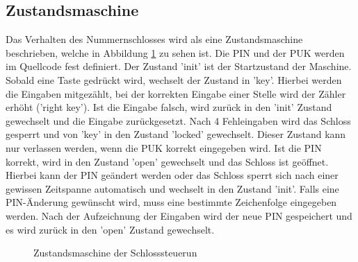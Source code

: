 \subsection{Zustandsmaschine}

Das Verhalten des Nummernschlosses wird als eine Zustandsmaschine beschrieben, welche in Abbildung \ref{fig:M1} zu sehen ist. Die PIN und der PUK werden im Quellcode fest definiert. Der Zustand 'init' ist der Startzustand der Maschine. Sobald eine Taste gedrückt wird, wechselt der Zustand in 'key'. Hierbei werden die Eingaben mitgezählt, bei der korrekten Eingabe einer Stelle wird der Zähler erhöht ('right key'). Ist die Eingabe falsch, wird zurück in den 'init' Zustand gewechselt und die Eingabe zurückgesetzt. Nach 4 Fehleingaben wird das Schloss gesperrt und von 'key' in den Zustand 'locked' gewechselt. Dieser Zustand kann nur verlassen werden, wenn die PUK korrekt eingegeben wird. Ist die PIN korrekt, wird in den Zustand 'open' gewechselt und das Schloss ist geöffnet. Hierbei kann der PIN geändert werden oder das Schloss sperrt sich nach einer gewissen Zeitspanne automatisch und wechselt in den Zustand 'init'. Falls eine PIN-Änderung gewünscht wird, muss eine bestimmte Zeichenfolge eingegeben werden. Nach der Aufzeichnung der Eingaben wird der neue PIN gespeichert und es wird zurück in den 'open' Zustand gewechselt. 

\begin{figure}[H]
\caption{Zustandsmaschine der Schlosssteuerun} \label{fig:M1}
\centering
\end{figure}


